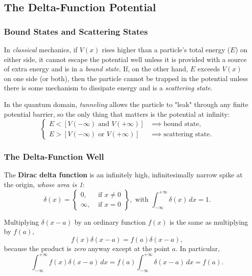 \documentclass{article}
\begin{document}
\subsection{The Delta-Function Potential}

\subsubsection{Bound States and Scattering States}

In \emph{classical} mechanics, if $V(x)$ rises higher than a particle's total
energy ($E$) on either side, it cannot escape the potential well unless it is
provided with a source of extra energy and is in a \emph{bound state}. If, on
the other hand, $E$ exceeds $V(x)$ on one side (or both), then the particle
cannot be trapped in the potential unless there is some mechanism to dissipate
energy and is a \emph{scattering state}.

In the quantum domain, \emph{tunneling} allows the particle to "leak" through
any finite potential barrier, so the only thing that matters is the potential
at infinity:
\begin{equation} \label{eq:qtm-stat}
  \begin{cases}
    E < [V(-\infty) \text{ and } V(+\infty)] &\implies \text{bound state}, \\
    E > [V(-\infty) \text{ or } V(+\infty)] &\implies \text{scattering state}.
  \end{cases}
\end{equation}

\subsubsection{The Delta-Function Well}

The \textbf{Dirac delta function} is an infinitely high, infinitesimally
narrow spike at the origin, \emph{whose area is 1}:
\begin{equation}
  \delta(x) = \left.
  \begin{cases}
    0, &\text{ if } x \neq 0 \\
    \infty, &\text{ if } x = 0
  \end{cases}
\right\}, \text{ with } \int_{-\infty}^{+\infty} \delta(x) \,dx = 1.
\end{equation}

Multiplying $\delta(x - a)$ by an ordinary function $f(x)$ is the same as
multiplying by $f(a)$, \[
  f(x)\delta(x - a) = f(a)\delta(x - a),
\] because the product is \emph{zero} anyway except at the point $a$. In
particular, \[
  \int_{-\infty}^{+\infty} f(x)\delta(x - a) \,dx
  = f(a) \int_{-\infty}^{+\infty} \delta(x - a) \,dx
  = f(a).
\]
\end{document}
